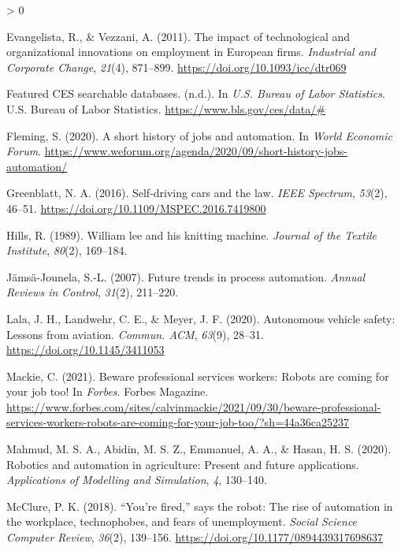 \documentclass[
  english,
  man]{apa7}
\newlength{\cslhangindent}
\newenvironment{CSLReferences}[2] %
 {%
  \setlength{\parindent}{0pt}
  \ifodd #1 \everypar{\setlength{\hangindent}{\cslhangindent}}\ignorespaces\fi
  \ifnum #2 > 0
  \setlength{\parskip}{#2\baselineskip}
  \fi
 }%
 {}
\begin{document}
\begin{CSLReferences}{1}{0}
\leavevmode\hypertarget{ref-10.1093ux2ficcux2fdtr069}{}%
Evangelista, R., \& Vezzani, A. (2011). {The impact of technological and organizational innovations on employment in European firms}. \emph{Industrial and Corporate Change}, \emph{21}(4), 871--899. \url{https://doi.org/10.1093/icc/dtr069}

\leavevmode\hypertarget{ref-u.s}{}%
Featured CES searchable databases. (n.d.). In \emph{U.S. Bureau of Labor Statistics}. U.S. Bureau of Labor Statistics. \url{https://www.bls.gov/ces/data/\#}

\leavevmode\hypertarget{ref-fleming_2020}{}%
Fleming, S. (2020). A short history of jobs and automation. In \emph{World Economic Forum}. \url{https://www.weforum.org/agenda/2020/09/short-history-jobs-automation/}

\leavevmode\hypertarget{ref-7419800}{}%
Greenblatt, N. A. (2016). Self-driving cars and the law. \emph{IEEE Spectrum}, \emph{53}(2), 46--51. \url{https://doi.org/10.1109/MSPEC.2016.7419800}

\leavevmode\hypertarget{ref-hills1989william}{}%
Hills, R. (1989). William lee and his knitting machine. \emph{Journal of the Textile Institute}, \emph{80}(2), 169--184.

\leavevmode\hypertarget{ref-jamsa2007future}{}%
Jämsä-Jounela, S.-L. (2007). Future trends in process automation. \emph{Annual Reviews in Control}, \emph{31}(2), 211--220.

\leavevmode\hypertarget{ref-10.1145ux2f3411053}{}%
Lala, J. H., Landwehr, C. E., \& Meyer, J. F. (2020). Autonomous vehicle safety: Lessons from aviation. \emph{Commun. ACM}, \emph{63}(9), 28--31. \url{https://doi.org/10.1145/3411053}

\leavevmode\hypertarget{ref-mackie_2021}{}%
Mackie, C. (2021). Beware professional services workers: Robots are coming for your job too! In \emph{Forbes}. Forbes Magazine. \url{https://www.forbes.com/sites/calvinmackie/2021/09/30/beware-professional-services-workers-robots-are-coming-for-your-job-too/?sh=44a36ca25237}

\leavevmode\hypertarget{ref-mahmud2020robotics}{}%
Mahmud, M. S. A., Abidin, M. S. Z., Emmanuel, A. A., \& Hasan, H. S. (2020). Robotics and automation in agriculture: Present and future applications. \emph{Applications of Modelling and Simulation}, \emph{4}, 130--140.

\leavevmode\hypertarget{ref-PaulKMcclure2018}{}%
McClure, P. K. (2018). {``You're fired,''} says the robot: The rise of automation in the workplace, technophobes, and fears of unemployment. \emph{Social Science Computer Review}, \emph{36}(2), 139--156. \url{https://doi.org/10.1177/0894439317698637}


\end{CSLReferences}
\end{document}
